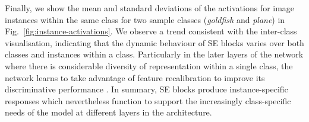 Finally, we show the mean and standard deviations of the activations for image instances within the same class for two sample classes (\textit{goldfish} and \textit{plane}) in Fig.~\ref{fig:instance-activations}.  We observe a trend consistent with the inter-class visualisation, indicating that the dynamic behaviour of SE blocks varies over both classes and instances within a class. Particularly in the later layers of the network where there is considerable diversity of representation within a single class, the network learns to take advantage of feature recalibration to improve its discriminative performance \cite{hu2018GE}. In summary, SE blocks produce instance-specific responses which nevertheless function to support the increasingly class-specific needs of the model at different layers in the architecture.